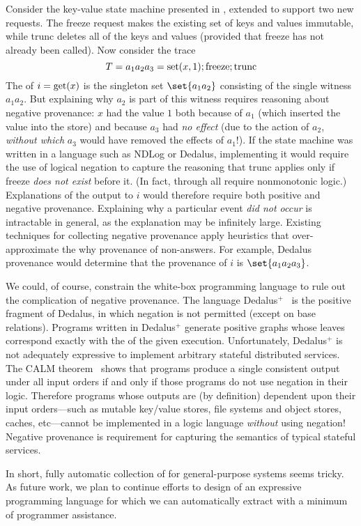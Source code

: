 Consider the key-value state machine presented in ,
extended to support two new requests. The freeze request makes the existing set of keys and
values immutable, while trunc deletes all of the keys and values (provided that
freeze has not already been called). Now consider the trace
\[
  T = a_1 a_2 a_3 = \text{set}(x,1); \text{freeze}; \text{trunc}
\]
The \watprovenance{} of $i = \text{get}(x)$ is the singleton set $\set{a_1a_2}$
consisting of the single witness $a_1a_2$. But explaining why $a_2$ is part of
this witness requires reasoning about negative provenance: $x$ had the value $1$ both
because of $a_1$ (which inserted the value into the store) and because $a_3$
had \emph{no effect} (due to the action of $a_2$, \emph{without which} $a_3$ would have
removed the effects of $a_1$!). If the state machine was written in a language
such as NDLog or Dedalus, implementing it would require the use of logical
negation to capture the reasoning that trunc applies only if freeze \emph{does not exist} before it.
 (In fact,  through
 all require nonmonotonic logic.) Explanations of the output to $i$ would therefore require both positive and negative
provenance. Explaining why a particular event \emph{did not occur} is
intractable in general, as the explanation may be infinitely large.  Existing
techniques for collecting negative provenance apply heuristics that
over-approximate the why provenance of non-answers. For example, Dedalus
provenance would determine that the provenance of $i$ is $\set{a_1a_2a_3}$.

\newcommand{\dedalusplus}{Dedalus$^+$}
We could, of course, constrain the white-box programming language to rule out the
complication of negative provenance.  The language
\dedalusplus~\cite{marczak2012confluence} is the positive fragment of Dedalus,
in which negation is not permitted (except on base relations). Programs written
in \dedalusplus{} generate positive \whyprovenance{} graphs whose leaves
correspond exactly with the \watprovenance{} of the given execution.
Unfortunately, \dedalusplus{} is not adequately expressive to implement
arbitrary stateful distributed services. The CALM
theorem~\cite{alvaro2011consistency,ameloot2013transducers} shows that
programs produce a single consistent output under all input orders
if and only if those programs do not use negation in their logic. Therefore
programs whose outputs are (by definition) dependent upon their input
orders---such as mutable key/value stores, file systems and object stores,
caches, etc---cannot be implemented in a logic language \emph{without} using
negation! Negative provenance is requirement for capturing the semantics of
typical stateful services.

In short, fully automatic collection of \watprovenance{} for general-purpose
systems seems tricky. As future work, we plan to continue efforts to design of
an expressive programming language for which we can automatically extract
\watprovenance{} with a minimum of programmer assistance.

